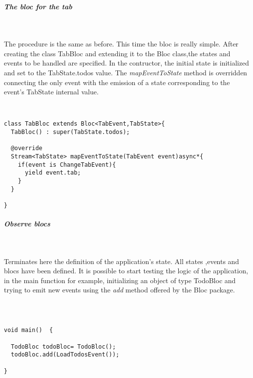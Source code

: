\subparagraph{The bloc for the tab}\mbox{}\\
\label{subpar:todo_app_bloc_core_state}

The procedure is the same as before. This time the bloc is really simple.  After creating the class TabBloc and extending it to the Bloc class,the states and events to be handled are specified.  In the contructor, the initial state is initialized and set to the TabState.todos value. The \textit{mapEventToState} method is overridden connecting the only event with the emission of a state corresponding to the event's TabState internal value.

\begin{code}
\mbox{}\\
 \mbox{}
\label{code:2.14}
\begin{verbatim}
class TabBloc extends Bloc<TabEvent,TabState>{
  TabBloc() : super(TabState.todos);

  @override
  Stream<TabState> mapEventToState(TabEvent event)async*{
    if(event is ChangeTabEvent){
      yield event.tab;
    }
  }

}
\end{verbatim}
\mbox{}
\end{code}

\subparagraph{Observe blocs}\mbox{}\\
\label{subpar:todo_app_bloc_core_state}

Terminates here the definition of the application’s state. All states ,events and blocs have been defined. It is possible to start testing the logic of the application, in the main function for example, initializing an object of type TodoBloc and trying to emit new events using the \textit{add} method offered by the Bloc package.
\begin{code}
\mbox{}\\
 \mbox{}
\label{code:2.14}
\begin{verbatim}

void main()  {
  
  TodoBloc todoBloc= TodoBloc();
  todoBloc.add(LoadTodosEvent());
  
}
\end{verbatim}
\mbox{}
\end{code}

